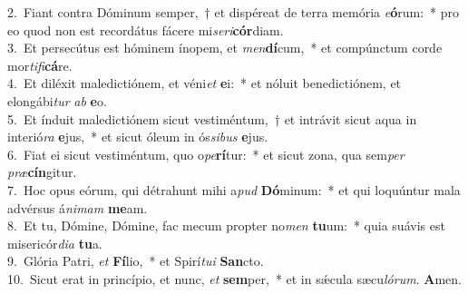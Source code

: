 {2.~}Fiant contra Dóminum semper,~† et dispéreat de terra memória \textit{e}\textbf{ó}rum:~* pro eo quod non est recordátus fácere mi\textit{se}\textit{ri}\textbf{cór}diam.\\
{3.~}Et persecútus est hóminem ínopem, et \textit{men}\textbf{dí}cum,~* et compúnctum corde mor\textit{ti}\textit{fi}\textbf{cá}re.\\
{4.~}Et diléxit maledictiónem, et véni\textit{et} \textbf{e}i:~* et nóluit benedictiónem, et elongábi\textit{tur} \textit{ab} \textbf{e}o.\\
{5.~}Et índuit maledictiónem sicut vestiméntum,~† et intrávit sicut aqua in interió\textit{ra} \textbf{e}jus,~* et sicut óleum in ós\textit{si}\textit{bus} \textbf{e}jus.\\
{6.~}Fiat ei sicut vestiméntum, quo o\textit{pe}\textbf{rí}tur:~* et sicut zona, qua sem\textit{per} \textit{præ}\textbf{cín}gitur.\\
{7.~}Hoc opus eórum, qui détrahunt mihi a\textit{pud} \textbf{Dó}minum:~* et qui loquúntur mala advérsus á\textit{ni}\textit{mam} \textbf{me}am.\\
{8.~}Et tu, Dómine, Dómine, fac mecum propter no\textit{men} \textbf{tu}um:~* quia suávis est misericór\textit{di}\textit{a} \textbf{tu}a.\\
{9.~}Glória Patri, \textit{et} \textbf{Fí}lio,~* et Spirí\textit{tu}\textit{i} \textbf{San}cto.\\
{10.~}Sicut erat in princípio, et nunc, \textit{et} \textbf{sem}per,~* et in sǽcula sæcu\textit{ló}\textit{rum}. \textbf{A}men.\\
